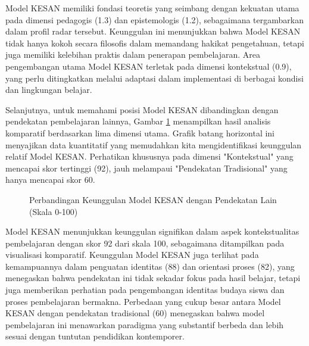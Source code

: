 \documentclass[12pt,a4paper,oneside]{book}
\begin{document}
Model KESAN memiliki fondasi teoretis yang seimbang dengan kekuatan utama pada dimensi pedagogis (1.3) dan epistemologis (1.2), sebagaimana tergambarkan dalam profil radar tersebut. Keunggulan ini menunjukkan bahwa Model KESAN tidak hanya kokoh secara filosofis dalam memandang hakikat pengetahuan, tetapi juga memiliki kelebihan praktis dalam penerapan pembelajaran. Area pengembangan utama Model KESAN terletak pada dimensi kontekstual (0.9), yang perlu ditingkatkan melalui adaptasi dalam implementasi di berbagai kondisi dan lingkungan belajar.

Selanjutnya, untuk memahami posisi Model KESAN dibandingkan dengan pendekatan pembelajaran lainnya, Gambar \ref{fig:perbandingan_pendekatan} menampilkan hasil analisis komparatif berdasarkan lima dimensi utama. Grafik batang horizontal ini menyajikan data kuantitatif yang memudahkan kita mengidentifikasi keunggulan relatif Model KESAN. Perhatikan khususnya pada dimensi "Kontekstual" yang mencapai skor tertinggi (92), jauh melampaui "Pendekatan Tradisional" yang hanya mencapai skor 60.

\begin{figure}[H]
  \centering
  \caption{Perbandingan Keunggulan Model KESAN dengan Pendekatan Lain (Skala 0-100)}
  \label{fig:perbandingan_pendekatan}
\end{figure}

Model KESAN menunjukkan keunggulan signifikan dalam aspek kontekstualitas pembelajaran dengan skor 92 dari skala 100, sebagaimana ditampilkan pada visualisasi komparatif. Keunggulan Model KESAN juga terlihat pada kemampuannya dalam penguatan identitas (88) dan orientasi proses (82), yang menegaskan bahwa pendekatan ini tidak sekadar fokus pada hasil belajar, tetapi juga memberikan perhatian pada pengembangan identitas budaya siswa dan proses pembelajaran bermakna. Perbedaan yang cukup besar antara Model KESAN dengan pendekatan tradisional (60) menegaskan bahwa model pembelajaran ini menawarkan paradigma yang substantif berbeda dan lebih sesuai dengan tuntutan pendidikan kontemporer.
\end{document}
